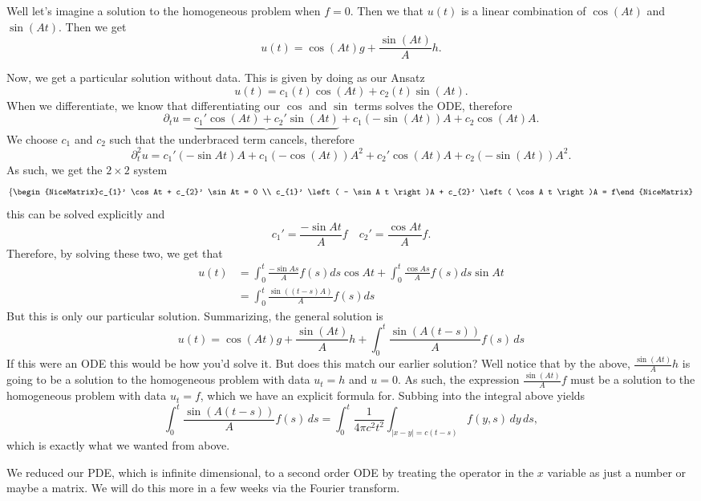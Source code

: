 Well let's imagine a solution to the homogeneous problem when \( f = 0 \). Then we that \( u(t) \) is a linear combination of \( \cos(At) \) and \( \sin(At) \). Then we get
\[ u(t) = \cos(At) g + \frac{\sin(At)}{A}h. \]

Now, we get a particular solution without data. This is given by doing as our Ansatz
\[ u(t) = c_{1}(t) \cos(At) + c_{2}(t) \sin(At). \]
When we differentiate, we know that differentiating our \( \cos \) and \( \sin \) terms solves the ODE, therefore
\[ \partial_{t} u = \underbrace{c_{1}' \cos(At) + c_{2}' \sin(At)} + c_{1} \left( - \sin(At) \right)A + c_{2} \cos(At) A. \]
We choose \( c_{1} \) and \( c_{2} \) such that the underbraced term cancels, therefore
\[ \partial_{t}^{2} u = c_{1}' \left( - \sin At \right)A + c_{1} \left( - \cos (At) \right)A^{2} + c_{2}' \cos(At) A + c_{2} \left( - \sin(At) \right) A^{2}. \]
As such, we get the \( 2 \times 2 \) system
\[ \left\{\begin{NiceMatrix}c_{1}' \cos At + c_{2}' \sin At = 0 \\ c_{1}' \left( - \sin A t \right)A + c_{2}' \left( \cos A t \right)A = f\end{NiceMatrix}\right.  \]
this can be solved explicitly and
\[ c_{1}' = \frac{- \sin At}{A} f \quad c_{2}' = \frac{\cos A t}{A} f. \]
Therefore, by solving these two, we get that
\begin{align*}
	u(t) &= \int_{0}^{t} \frac{- \sin As}{A} f(s) ds \cos At + \int_{0}^{t} \frac{\cos As}{A} f(s) ds \sin At \\
			 &= \int_{0}^{t} \frac{\sin\left(\left( t - s \right)A\right)}{A} f(s) ds
\end{align*}
But this is only our particular solution. Summarizing, the general solution is
\[ u(t) = \cos(At) g + \frac{\sin(At)}{A}h + \int_{0}^{t} \frac{\sin(A(t-s))}{A}f(s) \, ds \]
If this were an ODE this would be how you'd solve it. But does this match our earlier solution? Well notice that by the above, \( \frac{\sin (At)}{A} h \) is going to be a solution to the homogeneous problem with data \( u_{t} = h \) and \( u = 0 \). As such, the expression \( \frac{\sin (At)}{A} f \) must be a solution to the homogeneous problem with data \( u_{t} = f \), which we have an explicit formula for. Subbing into the integral above yields
\[ \int_{0}^{t} \frac{\sin(A(t-s))}{A}f(s) \, ds = \int_{0}^{t} \frac{1}{4 \pi c^{2} t^{2}} \int_{|x-y| = c(t-s)} f(y, s) \, dy \, ds,  \]
which is exactly what we wanted from above. 

We reduced our PDE, which is infinite dimensional, to a second order ODE by treating the operator in the \( x \) variable as just a number or maybe a matrix. We will do this more in a few weeks via the Fourier transform.

